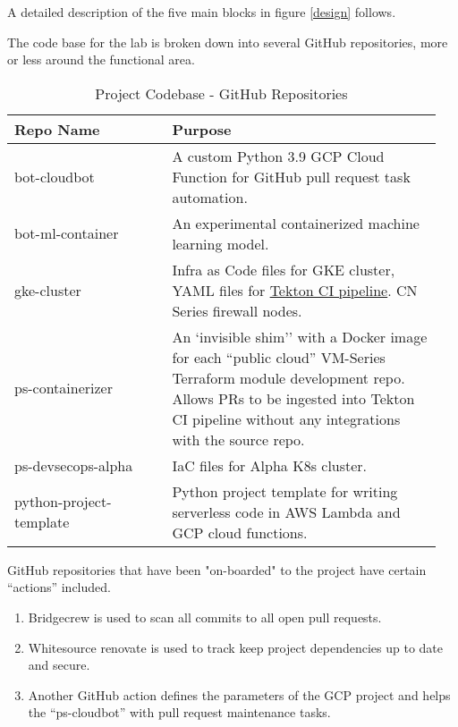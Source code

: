 \justifying
A detailed description of the five main blocks in figure \ref{design} follows.

\newpage
{}

\justifying
The code base for the lab is broken down into several GitHub repositories, more or less around the functional area. 

\begin{table}[ht]
    \centering
	\begin{tabular}{| p{0.35\linewidth} | p{0.6\linewidth} |} \hline
		Repo Name & Purpose \\\hline
		bot-cloudbot     & A custom Python 3.9 GCP Cloud Function for GitHub pull request task automation.\\\hline
		bot-ml-container & An experimental containerized machine learning model.\\\hline
		gke-cluster      & Infra as Code files for GKE cluster, YAML files for \href{https://tekton.dev/}{Tekton CI pipeline}. CN Series firewall nodes.\\\hline
		ps-containerizer & An `invisible shim'' with a Docker image for each ``public cloud'' VM-Series Terraform module development repo. Allows PRs to be
		ingested into Tekton CI pipeline without any integrations with the source repo.\\\hline
		ps-devsecops-alpha & IaC files for Alpha K8s cluster.\\\hline
		python-project-template & Python project template for writing serverless code in AWS Lambda and GCP cloud functions.\\\hline
	\end{tabular}
	\caption{Project Codebase - GitHub Repositories}
    \label{mytable:1}
\end{table}
\vspace{2mm}
\vspace{2mm}
\justifying
GitHub repositories that have been "on-boarded" to the project have certain ``actions'' included.

\begin{raggedright}
	\begin{enumerate}
        \item Bridgecrew is used to scan all commits to all open pull requests.
        \item Whitesource renovate is used to track keep project dependencies up to date and secure.
        \item Another GitHub action defines the parameters of the GCP project and helps the ``ps-cloudbot'' with pull request  maintenance tasks.
	\end{enumerate}
\end{raggedright}
\vspace{2mm}

